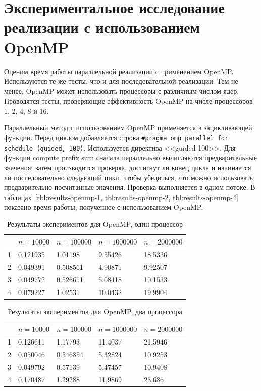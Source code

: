\documentclass[specification,annotation]{itmo-student-thesis}
\begin{document}
\section{Экспериментальное исследование реализации с использованием OpenMP}

Оценим время работы параллельной реализации с применением OpenMP. Используются те же тесты, что и для последовательной реализации.
Тем не менее, OpenMP может использовать процессоры с различным числом ядер. Проводятся тесты, проверяющие эффективность OpenMP на числе процессоров 1, 2, 4, 8 и 16.

Параллельный метод с использованием OpenMP применяется в зацикливающей функции. Перед циклом добавляется строка 
\texttt{\#pragma omp parallel for schedule (guided, 100)}. Используется директива <<guided 100>>. 
Для функции compute prefix sum сначала параллельно вычисляются предварительные значения; затем производится проверка, достигнут ли конец цикла и начинается ли последовательно следующий цикл, чтобы убедиться, что можно использовать предварительно посчитанные значения. Проверка выполняется в одном потоке. В таблицах~\ref{tbl:results-openmp-1, tbl:results-openmp-2, tbl:results-openmp-4} показано время работы, полученное с использованием OpenMP.

\begin{table}[!ht]
\centering
\begin{tabular}{|l|l|l|l|l|}\hline
 & $n=10000$ & $n=100000$ & $n=1000000$ & $n=2000000$ \\\hline
1 & 0.121935 & 1.01198 & 9.55426 & 18.5336 \\\hline
2 & 0.049391 & 0.508561 & 4.90871 & 9.92507 \\\hline
3 & 0.049772 & 0.526611 & 5.08418 & 10.1533 \\\hline
4 & 0.079227 & 1.02531 & 10.0432 & 19.9904 \\\hline
\end{tabular}
\caption{Результаты экспериментов для OpenMP, один процессор}\label{tbl:results-openmp-1}
\end{table}

\begin{table}[!ht]
\centering
\begin{tabular}{|l|l|l|l|l|}\hline
 & $n=10000$ & $n=100000$ & $n=1000000$ & $n=2000000$ \\\hline
1 & 0.126611 & 1.17793 & 11.4037 & 21.5946 \\\hline
2 & 0.050046 & 0.546854 & 5.32824 & 10.9253 \\\hline
3 & 0.049792 & 0.57139 & 5.47457 & 10.9408 \\\hline
4 & 0.170487 & 1.29288 & 11.9869 & 23.686 \\\hline
\end{tabular}
\caption{Результаты экспериментов для OpenMP, два процессора}\label{tbl:results-openmp-2}
\end{table}
\end{document}
